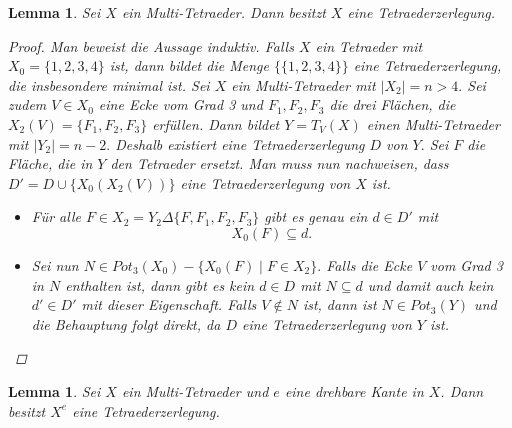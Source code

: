 \documentclass[12pt,titlepage,twoside,cleardoublepage]{article}
\theoremstyle{nummermitklammern}
\newtheorem{lemma}[temp]{Lemma}
\newtheorem{lemma}[zahl]{Lemma}
\numberwithin{equation}{section}
\begin{document}
\begin{lemma}\label{zerlegung}
Sei $X$ ein Multi-Tetraeder. Dann besitzt $X$ eine Tetraederzerlegung. 
\begin{proof}
Man beweist die Aussage induktiv. Falls $X$ ein Tetraeder mit $X_0=\{1,2,3,4\}$ ist, dann bildet die Menge $\{\{1,2,3,4\}\}$ eine Tetraederzerlegung, die insbesondere minimal ist.
Sei $X$ ein Multi-Tetraeder mit $\vert X_2\vert =n > 4.$ Sei zudem $V\in X_0$ eine Ecke vom Grad 3 und $F_1,F_2,F_3$ die drei Flächen, die $X_2(V)=\{F_1,F_2,F_3\}$ erfüllen.  Dann bildet $Y=T_V(X)$ einen Multi-Tetraeder mit $\vert Y_2 \vert =n-2.$ Deshalb existiert eine Tetraederzerlegung $D$ von $Y.$ Sei $F$ die Fläche, die in $Y$ den Tetraeder ersetzt. Man muss nun nachweisen, dass $D'=D\cup \{X_0(X_2(V))\}$ eine Tetraederzerlegung von $X$ ist.
\begin{itemize}
\item Für alle $F\in X_2= Y_2 \Delta\{F,F_1,F_2,F_3\}$ gibt es genau ein $d\in D'$ mit 
\[
X_0(F)\subseteq d.
\] 
\item Sei nun $N\in Pot_3(X_0)-\{X_0(F)\mid F\in X_2\}.$ Falls die Ecke $V$ vom Grad 3 in $N$ enthalten ist, 
dann gibt es kein $d\in D$ mit $N\subseteq d$ und damit auch kein $d'\in D'$ mit dieser Eigenschaft. Falls $V\notin N$ ist, dann ist $N\in Pot_3(Y)$ und die Behauptung folgt direkt, da $D$ eine Tetraederzerlegung von $Y$ ist.
\end{itemize}
\end{proof}
\end{lemma}
  \begin{lemma}\label{tzer}
 Sei $X$ ein Multi-Tetraeder und $e$ eine drehbare Kante in $X$. Dann besitzt $X^e$ eine Tetraederzerlegung. 
 \end{lemma}
\end{document}
